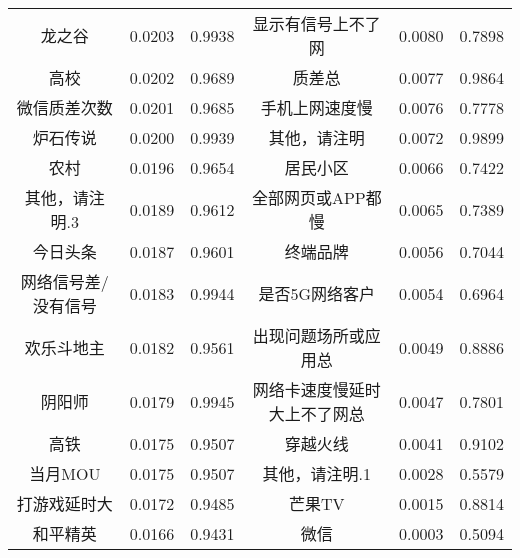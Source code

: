 \documentclass{MathorCupmodeling}
\begin{document}
\begin{table}[H]
{\begin{tabular}{ccc||ccc}
		  龙之谷   & 0.0203  & 0.9938  & 显示有信号上不了网 & 0.0080  & 0.7898  \\
		  高校    & 0.0202  & 0.9689  & 质差总   & 0.0077  & 0.9864  \\
		  微信质差次数 & 0.0201  & 0.9685  & 手机上网速度慢 & 0.0076  & 0.7778  \\
		  炉石传说  & 0.0200  & 0.9939  & 其他，请注明 & 0.0072  & 0.9899  \\
		  农村    & 0.0196  & 0.9654  & 居民小区  & 0.0066  & 0.7422  \\
		  其他，请注明.3 & 0.0189  & 0.9612  & 全部网页或APP都慢 & 0.0065  & 0.7389  \\
		  今日头条  & 0.0187  & 0.9601  & 终端品牌  & 0.0056  & 0.7044  \\
		  网络信号差/没有信号 & 0.0183  & 0.9944  & 是否5G网络客户 & 0.0054  & 0.6964  \\
		  欢乐斗地主 & 0.0182  & 0.9561  & 出现问题场所或应用总 & 0.0049  & 0.8886  \\
		  阴阳师   & 0.0179  & 0.9945  & 网络卡速度慢延时大上不了网总 & 0.0047  & 0.7801  \\
		  高铁    & 0.0175  & 0.9507  & 穿越火线  & 0.0041  & 0.9102  \\
		  当月MOU & 0.0175  & 0.9507  & 其他，请注明.1 & 0.0028  & 0.5579  \\
		  打游戏延时大 & 0.0172  & 0.9485  & 芒果TV  & 0.0015  & 0.8814  \\
		  和平精英  & 0.0166  & 0.9431  & 微信    & 0.0003  & 0.5094  \\
		  \bottomrule
		  \end{tabular}}
		\label{tab:a2ewmgrey}
	\end{table}
\newpage
	~\\
\end{document}
